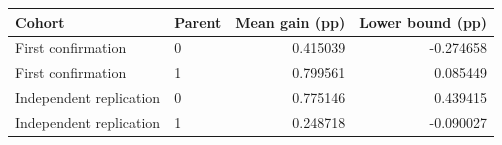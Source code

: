 \begin{tabular}{llrr}
\toprule
Cohort & Parent & Mean gain (pp) & Lower bound (pp) \\
\midrule
First confirmation & 0 & 0.415039 & -0.274658 \\
First confirmation & 1 & 0.799561 & 0.085449 \\
Independent replication & 0 & 0.775146 & 0.439415 \\
Independent replication & 1 & 0.248718 & -0.090027 \\
\bottomrule
\end{tabular}
